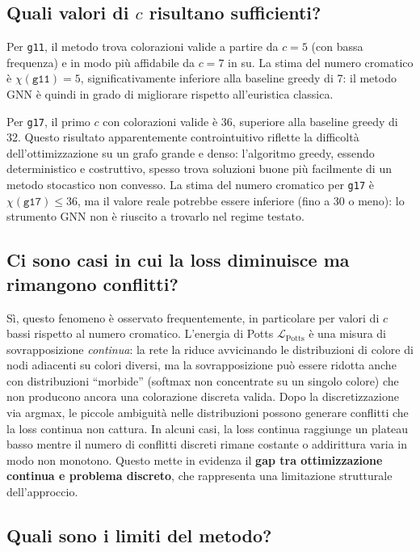 \documentclass[11pt, a4paper]{article}
\begin{document}
\subsection*{Quali valori di $c$ risultano sufficienti?}

Per \texttt{g11}, il metodo trova colorazioni valide a partire da $c = 5$ (con bassa
frequenza) e in modo più affidabile da $c = 7$ in su. La stima del numero cromatico è
$\chi(\texttt{g11}) = 5$, significativamente inferiore alla baseline greedy di 7: il
metodo GNN è quindi in grado di migliorare rispetto all'euristica classica.

Per \texttt{g17}, il primo $c$ con colorazioni valide è 36, superiore alla baseline greedy
di 32. Questo risultato apparentemente controintuitivo riflette la difficoltà
dell'ottimizzazione su un grafo grande e denso: l'algoritmo greedy, essendo deterministico
e costruttivo, spesso trova soluzioni buone più facilmente di un metodo stocastico non
convesso. La stima del numero cromatico per \texttt{g17} è $\chi(\texttt{g17}) \leq 36$,
ma il valore reale potrebbe essere inferiore (fino a 30 o meno): lo strumento GNN non è
riuscito a trovarlo nel regime testato.

\subsection*{Ci sono casi in cui la loss diminuisce ma rimangono conflitti?}

Sì, questo fenomeno è osservato frequentemente, in particolare per valori di $c$ bassi
rispetto al numero cromatico. L'energia di Potts $\mathcal{L}_{\mathrm{Potts}}$ è una
misura di sovrapposizione \emph{continua}: la rete la riduce avvicinando le distribuzioni
di colore di nodi adiacenti su colori diversi, ma la sovrapposizione può essere ridotta
anche con distribuzioni ``morbide'' (softmax non concentrate su un singolo colore) che non
producono ancora una colorazione discreta valida. Dopo la discretizzazione via argmax, le
piccole ambiguità nelle distribuzioni possono generare conflitti che la loss continua non
cattura. In alcuni casi, la loss continua raggiunge un plateau basso mentre il numero di
conflitti discreti rimane costante o addirittura varia in modo non monotono. Questo mette
in evidenza il \textbf{gap tra ottimizzazione continua e problema discreto}, che
rappresenta una limitazione strutturale dell'approccio.

\subsection*{Quali sono i limiti del metodo?}
\end{document}
